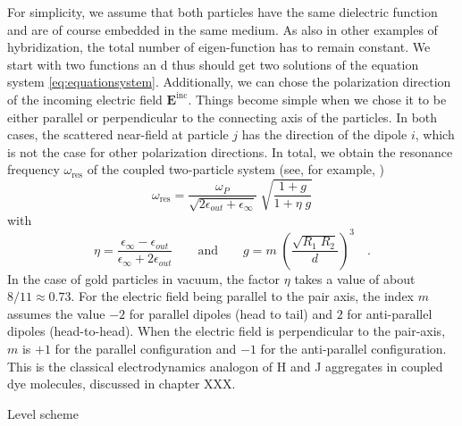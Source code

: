 For simplicity, we assume that both particles have the same dielectric function and are of course embedded in the same medium. As also  in other examples of hybridization, the  total number  of eigen-function has to remain constant. We start with two functions an d thus should get two  solutions  of the equation system \ref{eq:equationsystem}.
Additionally, we  can chose the polarization direction of the incoming electric field  $\mathbf{E}^{\text{inc}}$. Things become simple when we chose it to be either parallel or perpendicular to the connecting axis of the particles. In both cases, the scattered near-field at particle $j$ has the direction of the dipole $i$, which is not the case for other polarization directions.
In total, we obtain the resonance
frequency $\omega_{\text{res}} $ of the coupled two-particle system (see, for example, \cite{Myroshnychenko08} )
%
\begin{equation}  \label{eq:omega_coupled}
 \omega_{\text{res}} = \frac{\omega_P}{\sqrt{2 \epsilon_{out} + \epsilon_{\infty}} }  \; \sqrt{
\frac{1 + g}{ 1 +  \eta \; g}}
\end{equation}
%
with 
%
\begin{equation} \label{eq:omega_coupled_variables}
 \eta = \frac{\epsilon_{\infty} - \epsilon_{out} }{\epsilon_{\infty} + 2 \epsilon_{out}  } 
 \qquad \text{and} \qquad
    g = m \;  \left( \frac{\sqrt{R_1 \; R_2 } } { d }  \right)^3 \quad .
\end{equation}
%
In the case of gold particles in vacuum, the factor $\eta$ takes a value of about $8/11 \approx 0.73$.
For the electric field being parallel to the pair axis, the index $m$ assumes
the value $-2$ for parallel dipoles (head to tail) and $2$ for anti-parallel
dipoles (head-to-head). When the electric field is perpendicular to the
pair-axis, $m$ is $+1$ for the parallel configuration and $-1$ for the
anti-parallel configuration. This is the classical electrodynamics analogon  of H and J aggregates in coupled dye molecules, discussed in chapter XXX.

\begin{marginfigure}

\caption{Level scheme}
\end{marginfigure}

